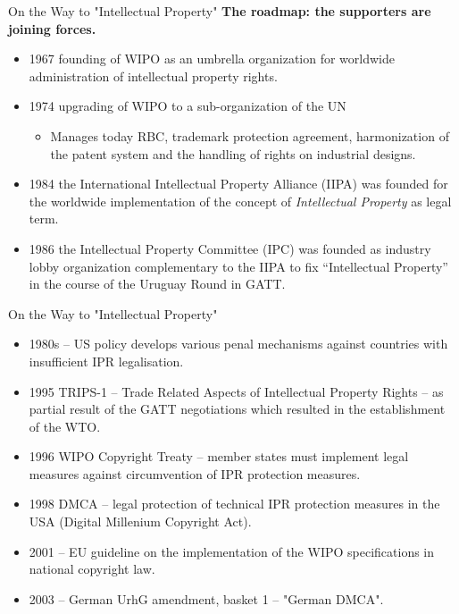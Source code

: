 \documentclass{beamer}
\begin{document}
\begin{frame}{On the Way to "Intellectual Property"}
\textbf{The roadmap: the supporters are joining forces.}
\begin{itemize}
\item 1967 founding of WIPO as an umbrella organization for worldwide
  administration of intellectual property rights.
\item 1974 upgrading of WIPO to a sub-organization of the UN
  \begin{itemize}
  \item Manages today RBC, trademark protection agreement, harmonization of
    the patent system and the handling of rights on industrial designs.
  \end{itemize}
\item 1984 the International Intellectual Property Alliance (IIPA) was founded
  for the worldwide implementation of the concept of \emph{Intellectual
    Property} as legal term.
\item 1986 the Intellectual Property Committee (IPC) was founded as industry
  lobby organization complementary to the IIPA to fix “Intellectual Property”
  in the course of the Uruguay Round in GATT.
\end{itemize}
\end{frame}

\begin{frame}{On the Way to "Intellectual Property"}
\begin{itemize}
\item 1980s -- US policy develops various penal mechanisms against countries
  with insufficient IPR legalisation.
\item 1995 TRIPS-1 -- Trade Related Aspects of Intellectual Property Rights --
  as partial result of the GATT negotiations which resulted in the
  establishment of the WTO.
\item 1996 WIPO Copyright Treaty -- member states must implement legal
  measures against circumvention of IPR protection measures.
\item 1998 DMCA -- legal protection of technical IPR protection measures in
  the USA (Digital Millenium Copyright Act).
\item 2001 -- EU guideline on the implementation of the WIPO specifications in
  national copyright law.
\item 2003 -- German UrhG amendment, basket 1 -- "German DMCA".
\end{itemize}
\end{frame}
\end{document}
